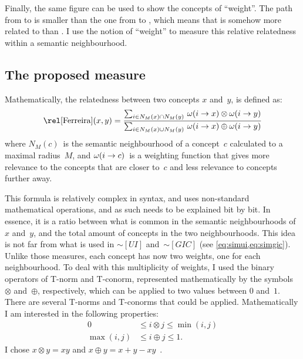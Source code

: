 Finally, the same figure can be used to show the concepts of ``weight''. The path from  to  is smaller than the one from  to , which means that  is somehow more related to  than . I use the notion of ``weight'' to measure this relative relatedness within a semantic neighbourhood.


\subsection{The proposed measure}

Mathematically, the relatedness between two concepts $x$ and~$y$, is defined as:
\begin{equation}
\ferreira(x,y) = \frac
    {\sum_{i\in N_M(x) \cap N_M(y)} \, \weight ix \otimes \weight iy}
    {\sum_{i\in N_M(x) \cup N_M(y)} \, \weight ix \oplus  \weight iy}
    \label{eq:ferreira}
\end{equation}
where $N_M(c)$~is the semantic neighbourhood of a concept~$c$ calculated to a maximal radius~$M$, and $\omega(i\rightarrow c)$~is a weighting function that gives more relevance to the concepts that are closer to~$c$ and less relevance to concepts further away.

This formula is relatively complex in syntax, and uses non-standard mathematical operations, and as such needs to be explained bit by bit. In essence, it is a ratio between what is common in the semantic neighbourhoods of $x$ and~$y$, and the total amount of concepts in the two neighbourhoods. This idea is not far from what is used in $\sim[UI]$ and~$\sim[GIC]$ (see \eqref{eq:simui,eq:simgic}). Unlike those measures, each concept has now two weights, one for each neighbourhood. To deal with this multiplicity of weights, I used the binary operators of T-norm and T-conorm, represented mathematically by the symbols $\otimes$ and~$\oplus$, respectively, which can be applied to two values between $0$ and~$1$. There are several T-norms and T-conorms that could be applied. Mathematically I am interested in the following properties:
\begin{align*}
    0          & \le i \otimes j \le \min(i, j) \\
    \max(i, j) & \le i \oplus j \le 1.
\end{align*}
I chose $x \otimes y = x y$ and $x \oplus y = x + y - x y$~\citep{Klement2004}.

